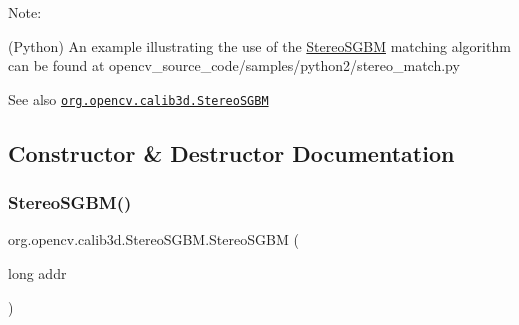 Note\+:


\begin{DoxyItemize}
\item (Python) An example illustrating the use of the \mbox{\hyperlink{classorg_1_1opencv_1_1calib3d_1_1_stereo_s_g_b_m}{Stereo\+S\+G\+BM}} matching algorithm can be found at opencv\+\_\+source\+\_\+code/samples/python2/stereo\+\_\+match.\+py 
\end{DoxyItemize}

\begin{DoxySeeAlso}{See also}
\href{http://docs.opencv.org/modules/calib3d/doc/camera_calibration_and_3d_reconstruction.html#stereosgbm}{\tt org.\+opencv.\+calib3d.\+Stereo\+S\+G\+BM} 
\end{DoxySeeAlso}


\subsection{Constructor \& Destructor Documentation}
\mbox{\label{classorg_1_1opencv_1_1calib3d_1_1_stereo_s_g_b_m_a8190d219547330a1e28ac4a3ab36eece}} 
\subsubsection{\texorpdfstring{Stereo\+S\+G\+B\+M()}{StereoSGBM()}\hspace{0.1cm}{\footnotesize\ttfamily [1/4]}}
{\footnotesize\ttfamily org.\+opencv.\+calib3d.\+Stereo\+S\+G\+B\+M.\+Stereo\+S\+G\+BM (\begin{DoxyParamCaption}\item[{long}]{addr }\end{DoxyParamCaption})\hspace{0.3cm}{\ttfamily [protected]}}

\mbox{\label{classorg_1_1opencv_1_1calib3d_1_1_stereo_s_g_b_m_a08dc75ba449a7f4915a258606bbd5e54}} 
